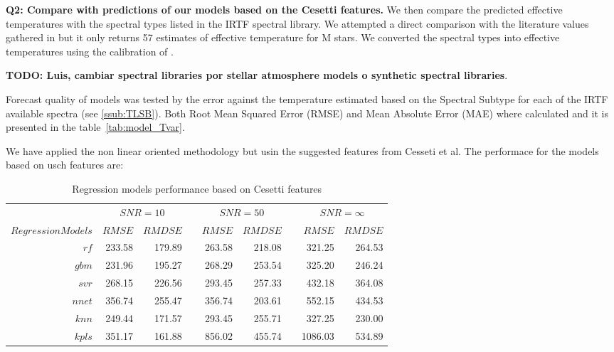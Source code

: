 
{\bf Q2: Compare with predictions of our models based on the Cesetti features.}
We then compare the predicted effective temperatures with the spectral
types listed in the IRTF spectral library. We attempted a direct
comparison with the literature values gathered in \cite{cesetti} but
it only returns 57 estimates of effective temperature for M stars. We
converted the spectral types into effective temperatures using the
calibration of \cite{2009ApJ...702..154S}.

{\bf TODO: Luis, cambiar spectral libraries por stellar atmosphere
models o synthetic spectral libraries}.

Forecast quality of models was tested by the error against the
temperature estimated based on the Spectral Subtype for each of the
IRTF available spectra (see \ref{ssub:TLSB}).  Both Root Mean Squared
Error (RMSE) and Mean Absolute Error (MAE) where calculated and it is
presented in the table~\ref{tab:model_Tvar}.


We have applied the non linear oriented methodology but usin the suggested features from Cesseti et al.
The performace for the models based on usch features are:

\begin{table}\centering
{}
\begin{tabular}{@{}rrrcrrcrr@{}}\toprule
& \multicolumn{2}{c}{$SNR = 10$} & \phantom{ab}& \multicolumn{2}{c}{$SNR = 50$} &
\phantom{ab} & \multicolumn{2}{c}{$SNR = \infty$}\\
\cmidrule{2-3} \cmidrule{5-6} \cmidrule{8-9}

$Regression Models$ & $RMSE$ & $RMDSE$ && $RMSE$ & $RMDSE$ && $RMSE$ & $RMDSE$ \\ \midrule
$rf $               & 233.58 & 179.89 && 263.58 & 218.08 && 321.25 & 264.53 \\
$ gbm $              & 231.96 & 195.27 && 268.29 & 253.54 && 325.20 & 246.24 \\
$ svr $             & 268.15 & 226.56 && 293.45 & 257.33 && 432.18 & 364.08 \\
$ nnet $            & 356.74 & 255.47 && 356.74 & 203.61 && 552.15 & 434.53 \\
$ knn $             & 249.44 & 171.57 && 293.45 & 255.71 && 327.25 & 230.00  \\
$ kpls $            & 351.17 & 161.88 && 856.02 & 455.74 && 1086.03 & 534.89 \\

\hline
\end{tabular}
\caption {Regression models performance based on Cesetti features} 
\label{tab:tab_CS_Model}
\end{table}

